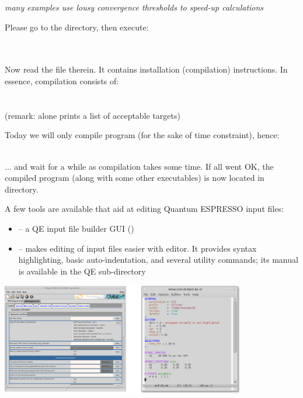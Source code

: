 \documentclass[landscape]{foils}
\begin{document}
{ {\em many examples use lousy convergence
    thresholds to speed-up calculations}}

%
Please go to the  directory, then execute:\\[1em]
\\
\\

Now read the  file therein. It contains installation
(compilation) instructions. In essence, compilation consists of:\\[1em]
\\
\\[0.5em]
(remark:  alone prints a list of acceptable targets)

Today we will only compile  program (for the sake of time constraint), hence:\\[0.5em]
\\

... and wait for a while as compilation takes some time. If all went
OK, the compiled  program (along with some other
executables) is now located in  directory.


\rightheader{}
\rightfooter{}
A few tools are available that aid at editing Quantum ESPRESSO input files:
\begin{itemize}
\item {} -- a QE input file builder GUI ()
\item {} -- makes editing of input files easier
  with  editor. It provides syntax highlighting, basic
  auto-indentation, and several utility commands; its manual is
  available in the QE sub-directory
\end{itemize}
\begin{center}
  \includegraphics[width=0.8\textwidth]{figs/pwgui+emacs-modes.png}
\end{center}
\end{document}
